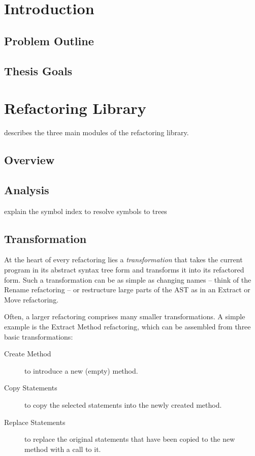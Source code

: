 \documentclass[10pt,a4paper,oneside]{scrreprt}
\begin{document}


\newpage

\setcounter{tocdepth}{2}

\tableofcontents

\newpage


\chapter{Introduction}
\section{Problem Outline}
\section{Thesis Goals}

\chapter{Refactoring Library}

describes the three main modules of the refactoring library.

\section{Overview}
\section{Analysis}

explain the symbol index to resolve symbols to trees

\section{Transformation}

At the heart of every refactoring lies a \textit{transformation} that takes the current program in its abstract syntax tree form and transforms it into its refactored form. Such a transformation can be as simple as changing names -- think of the Rename refactoring -- or restructure large parts of the AST as in an Extract or Move refactoring. 

Often, a larger refactoring comprises many smaller transformations. A simple example is the Extract Method refactoring, which can be assembled from three basic transformations:

\begin{description}
 \item[Create Method] to introduce a new (empty) method.
 \item[Copy Statements] to copy the selected statements into the newly created method.
 \item[Replace Statements] to replace the original statements that have been copied to the new method with a call to it.
\end{description}
\end{document}
